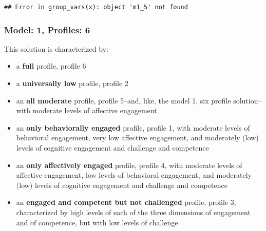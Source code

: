 \documentclass[]{book}
\providecommand{\tightlist}{%
  \setlength{\itemsep}{0pt}\setlength{\parskip}{0pt}}
\theoremstyle{definition}
\theoremstyle{definition}
\theoremstyle{definition}
\theoremstyle{remark}
\begin{document}
\begin{verbatim}
## Error in group_vars(x): object 'm1_5' not found
\end{verbatim}

\subsubsection{Model: 1, Profiles: 6}\label{model-1-profiles-6}

This solution is characterized by:

\begin{itemize}
\tightlist
\item
  a \textbf{full} profile, profile 6
\item
  a \textbf{universally low} profile, profile 2
\item
  an \textbf{all moderate} profile, profile 5--and, like, the model 1,
  six profile solution--with moderate levels of affective engagement
\item
  an \textbf{only behaviorally engaged} profile, profile 1, with
  moderate levels of behavioral engagement, very low affective
  engagement, and moderately (low) levels of cognitive engagement and
  challenge and competence
\item
  an \textbf{only affectively engaged} profile, profile 4, with moderate
  levels of affective engagement, low levels of behavioral engagement,
  and moderately (low) levels of cognitive engagement and challenge and
  competence
\item
  an \textbf{engaged and competent but not challenged} profile, profile
  3, characterized by high levels of each of the three dimensions of
  engagement and of competence, but with low levels of challenge
\end{itemize}
\end{document}
